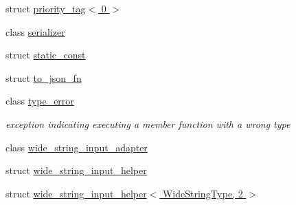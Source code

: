 \begin{DoxyCompactItemize}
struct \hyperlink{structnlohmann_1_1detail_1_1priority__tag_3_010_01_4}{priority\+\_\+tag$<$ 0 $>$}
\item 
class \hyperlink{classnlohmann_1_1detail_1_1serializer}{serializer}
\item 
struct \hyperlink{structnlohmann_1_1detail_1_1static__const}{static\+\_\+const}
\item 
struct \hyperlink{structnlohmann_1_1detail_1_1to__json__fn}{to\+\_\+json\+\_\+fn}
\item 
class \hyperlink{classnlohmann_1_1detail_1_1type__error}{type\+\_\+error}
\begin{DoxyCompactList}\small\item\em exception indicating executing a member function with a wrong type \end{DoxyCompactList}\item 
class \hyperlink{classnlohmann_1_1detail_1_1wide__string__input__adapter}{wide\+\_\+string\+\_\+input\+\_\+adapter}
\item 
struct \hyperlink{structnlohmann_1_1detail_1_1wide__string__input__helper}{wide\+\_\+string\+\_\+input\+\_\+helper}
\item 
struct \hyperlink{structnlohmann_1_1detail_1_1wide__string__input__helper_3_01WideStringType_00_012_01_4}{wide\+\_\+string\+\_\+input\+\_\+helper$<$ Wide\+String\+Type, 2 $>$}
\end{DoxyCompactItemize}
